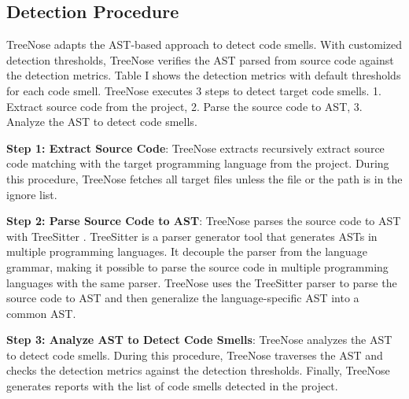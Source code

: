 \subsection{Detection Procedure}
\label{sec:Detection Procedure}

TreeNose adapts the AST-based approach to detect code smells. With customized detection thresholds,
TreeNose verifies the AST parsed from source code against the detection metrics. Table I shows the detection 
metrics with default thresholds for each code smell.
TreeNose executes 3 steps to detect target code smells. 1. Extract source code from the project, 2. Parse the source code to AST, 3. Analyze the AST to detect code smells.


\textbf{Step 1: Extract Source Code}: TreeNose extracts recursively extract source code matching with the target programming language from the project. During this procedure, TreeNose fetches
all target files unless the file or the path is in the ignore list.

\textbf{Step 2: Parse Source Code to AST}: TreeNose parses the source code to AST with TreeSitter \cite{treeSitter}. 
TreeSitter is a parser generator tool that generates ASTs in multiple programming languages. 
It decouple the parser from the language grammar, making it possible to parse the source code in 
multiple programming languages with the same parser. TreeNose uses the TreeSitter parser to parse the source code 
to AST and then generalize the language-specific AST into a common AST.

\textbf{Step 3: Analyze AST to Detect Code Smells}: TreeNose analyzes the AST to detect code smells. 
During this procedure, TreeNose traverses the AST and checks the detection metrics against the detection thresholds.
Finally, TreeNose generates reports with the list of code smells detected in the project.



